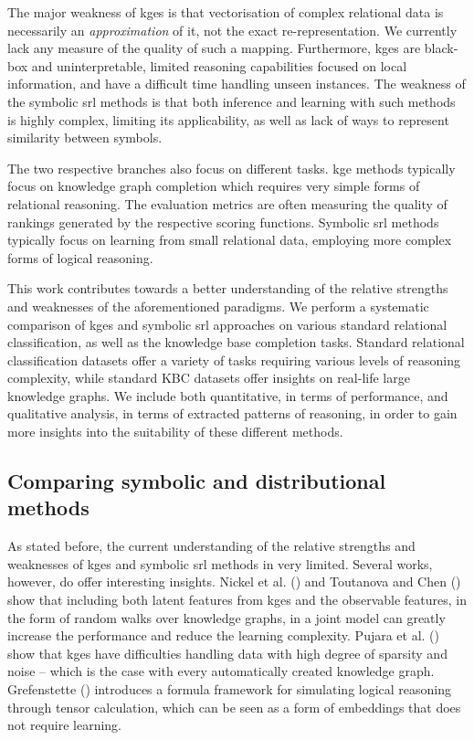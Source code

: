 The major weakness of \gls{kge}s is that vectorisation of complex relational data is necessarily an \textit{approximation} of it, not the exact re-representation.
We currently lack any measure of the quality of such a mapping.
Furthermore, \gls{kge}s are black-box and uninterpretable, limited reasoning capabilities focused on local information, and have a difficult time handling unseen instances.
The weakness of the symbolic \gls{srl} methods is that both inference and learning with such methods is highly complex, limiting its applicability, as well as lack of ways to represent similarity between symbols.



The two respective branches also focus on different tasks.
\gls{kge} methods typically focus on knowledge graph completion which requires very simple forms of relational reasoning. The evaluation metrics are often measuring the quality of rankings generated by the respective scoring functions.
Symbolic \gls{srl} methods typically focus on learning from small relational data, employing more complex forms of logical reasoning.






This work contributes towards a better understanding of the relative strengths and weaknesses of the aforementioned paradigms.
We perform a systematic comparison of \gls{kge}s and symbolic \gls{srl} approaches on various standard relational classification, as well as the knowledge base completion tasks.
Standard relational classification datasets offer a variety of tasks requiring various levels of reasoning complexity, while standard KBC datasets offer insights on real-life large knowledge graphs.
We include both quantitative, in terms of performance, and qualitative analysis, in terms of extracted patterns of reasoning, in order to gain more insights into the suitability of these different methods.









\subsection{Comparing symbolic and distributional methods}


As stated before, the current understanding of the relative strengths and weaknesses of \gls{kge}s and symbolic \gls{srl} methods in very limited.
Several works, however, do offer interesting insights.
Nickel et al. (\cite{NickleNIPS2014}) and Toutanova and Chen (\cite{toutanova2015observed}) show that including both latent features from \gls{kge}s and the observable features, in the form of random walks over knowledge graphs, in a joint model can greatly increase the performance and reduce the learning complexity.
Pujara et al. (\cite{pujara:emnlp17}) show that \gls{kge}s have difficulties handling data with high degree of sparsity and noise -- which is the case with every automatically created knowledge graph.
Grefenstette (\cite{GrefenstetteTFDS}) introduces a formula framework for simulating logical reasoning through tensor calculation, which can be seen as a form of embeddings that does not require learning.


